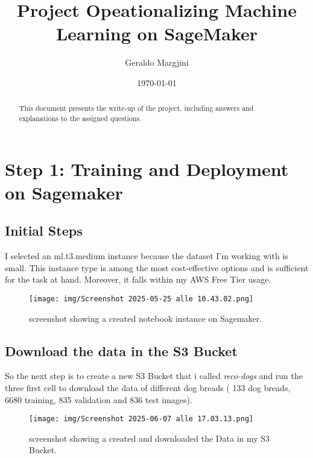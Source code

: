 \documentclass[12pt,a4paper]{article}
\title{Project Opeationalizing Machine Learning on SageMaker}
\author{Geraldo Margjini}
\date{\today}
\begin{document}
\maketitle

\begin{abstract}
This document presents the write-up of the project, including answers and explanations to the assigned questions.
\end{abstract}

\tableofcontents
\newpage

\section{Step 1: Training and Deployment on Sagemaker}
\subsection{Initial Steps}
I selected an ml.t3.medium instance because the dataset I’m working with is small. This instance type is among the most cost-effective options and is sufficient for the task at hand. Moreover, it falls within my AWS Free Tier usage.
\begin{figure}[htbp]
  \centering
  \texttt{[image: img/Screenshot 2025-05-25 alle 10.43.02.png]}
  \caption{screenshot showing a created notebook instance on Sagemaker.}
  \label{fig:example}
\end{figure}
\subsection{Download the data in the S3 Bucket}
So the next step is to create a new S3 Bucket that i called \textit{reco-dogs} and run the three first cell to download the data of different dog breads ( 133 dog breads, 6680 training, 835 validation and 836 test images).
\begin{figure}[htbp]
  \centering
  \texttt{[image: img/Screenshot 2025-06-07 alle 17.03.13.png]}
  \caption{screenshot showing a created and downloaded the Data in my S3 Bucket.}
  \label{fig:example}
\end{figure}
\end{document}
